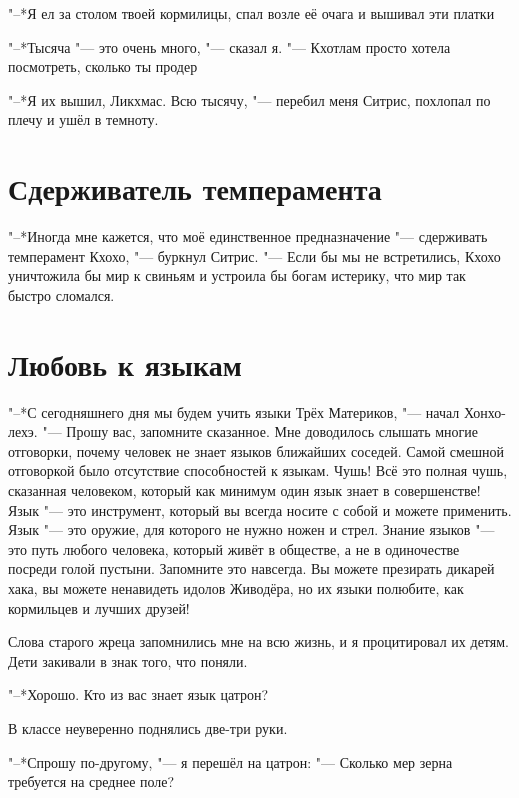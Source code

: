 \documentclass[a4paper,10pt,fleqn]{book}
\newcommand{\mulang}[3]{#2}%
\newcommand{\ldotst}{\so{...}\xspace}
\begin{document}
"--*Я ел за столом твоей кормилицы, спал возле её очага и вышивал эти платки\ldotst

"--*Тысяча "--- это очень много, "--- сказал я.
"--- Кхотлам просто хотела посмотреть, сколько ты продер\ldotst

"--*Я их вышил, Ликхмас.
Всю тысячу, "--- перебил меня Ситрис, похлопал по плечу и ушёл в темноту.

\section{Сдерживатель темперамента}

\mulang{}{"--*Иногда мне кажется, что моё единственное предназначение "--- сдерживать темперамент Кхохо, "--- буркнул Ситрис.}
{``Sometimes it seems my only destiny is to restrain Kch\`{o}h\^{o}'s temperament,'' S\~{\i}tr\v{\i}s grumbled.}
\mulang{}{"--- Если бы мы не встретились, Кхохо уничтожила бы мир к свиньям и устроила бы богам истерику, что мир так быстро сломался.}
{``If we hadn't met, Kch\`{o}h\^{o} would have destroyed the world and made an uproar to gods because it wasn't stable enough.''}

\section{Любовь к языкам}

"--*С сегодняшнего дня мы будем учить языки Трёх Материков, "--- начал Хонхо-лехэ.
"--- Прошу вас, запомните сказанное.
Мне доводилось слышать многие отговорки, почему человек не знает языков ближайших соседей.
Самой смешной отговоркой было отсутствие способностей к языкам.
Чушь!
Всё это полная чушь, сказанная человеком, который как минимум один язык знает в совершенстве!
Язык "--- это инструмент, который вы всегда носите с собой и можете применить.
Язык "--- это оружие, для которого не нужно ножен и стрел.
Знание языков "--- это путь любого человека, который живёт в обществе, а не в одиночестве посреди голой пустыни.
Запомните это навсегда.
Вы можете презирать дикарей хака, вы можете ненавидеть идолов Живодёра, но их языки полюбите, как кормильцев и лучших друзей!

Слова старого жреца запомнились мне на всю жизнь, и я процитировал их детям.
Дети закивали в знак того, что поняли.

"--*Хорошо.
Кто из вас знает язык цатрон?

В классе неуверенно поднялись две-три руки.

"--*Спрошу по-другому, "--- я перешёл на цатрон: "--- Сколько мер зерна требуется на среднее поле?
\end{document}
